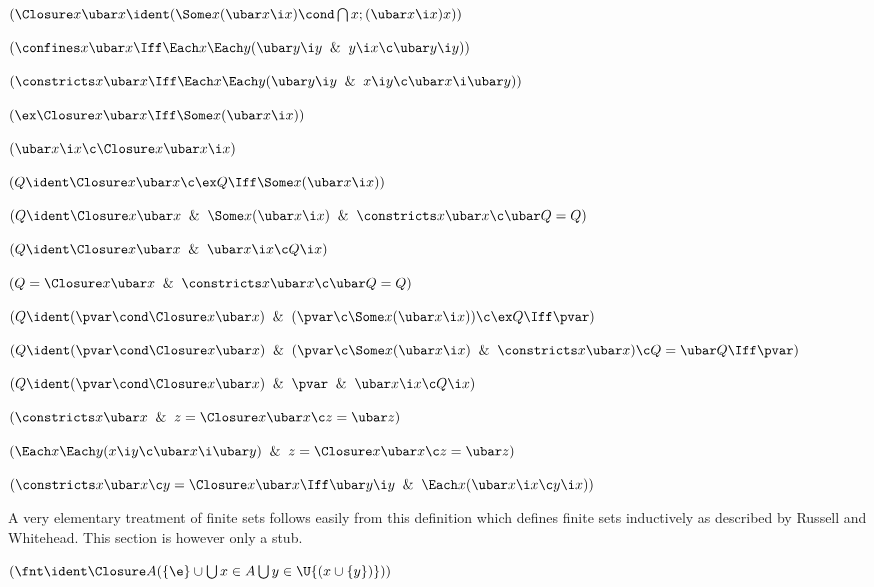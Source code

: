  $(\Closure x \ubar x \ident (\Some x (\ubar x \i x)
	\cond \bigcap x;(\ubar x \i x) x))$

 $(\confines x \ubar x \Iff 
\Each x\Each y(\ubar y \i y \And y \i x \c \ubar y \i y))$

 $(\constricts x \ubar x \Iff 
\Each x\Each y(\ubar y \i y \And x \i y \c \ubar x \i \ubar y))$



 $(\ex \Closure x \ubar x
\Iff \Some x (\ubar x \i x))$

 $(\ubar x \i x \c \Closure x \ubar x \i x)$

 $(Q \ident \Closure x \ubar x \c \ex Q \Iff \Some x (\ubar x\i x ))$

 $(Q \ident \Closure x \ubar x\And \Some x (\ubar x\i x ) \And \constricts x \ubar x
\c \ubar Q = Q)$

 $(Q \ident  \Closure x \ubar x\And \ubar x \i x \c Q \i x)$

 $(Q = \Closure x \ubar x \And \constricts x \ubar x \c \ubar Q = Q)$

 $(Q \ident (\pvar \cond \Closure x \ubar x)\And
(\pvar \c \Some x (\ubar x\i x )) \c \ex Q \Iff \pvar)$

 $(Q \ident (\pvar \cond \Closure x \ubar x)\And
(\pvar \c \Some x (\ubar x\i x ) \And \constricts x \ubar x) \c Q = \ubar Q \Iff \pvar)$

 $(Q \ident(\pvar\cond \Closure x\ubar x)\And \pvar \And \ubar x \i x \c Q \i x)$ 

 $(\constricts x \ubar x \And z = \Closure x \ubar x \c z = \ubar z)$


 $(\Each x\Each y (x \i y \c\ubar x\i\ubar y) 
	\And z = \Closure x \ubar x \c z = \ubar z)$

 $(\constricts x \ubar x \c 
	y = \Closure x \ubar x \Iff \ubar y \i y \And
	\Each x (\ubar x \i x \c y \i x))$
	\lineb



A very elementary treatment of finite sets follows easily from 
this definition which defines finite sets inductively as
described by Russell and Whitehead.  This section is however
only a stub.
\lineb


 $(\fnt \ident \Closure A
(\{\e\}\cup \bigcup x \in A\bigcup y \in \U \{(x \cup \{y\})\}))$

